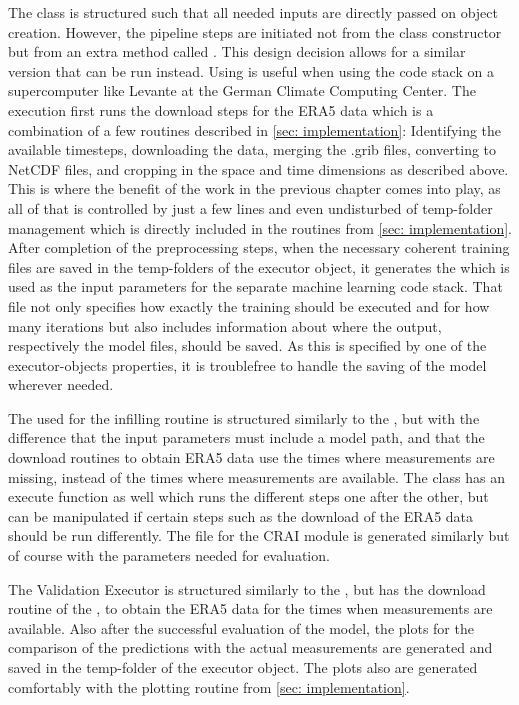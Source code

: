 The  class is structured such that all needed inputs are directly passed on object creation. However, the pipeline steps are initiated not from the class constructor but from an extra method called . This design decision allows for a similar  version that can be run instead. Using  is useful when using the code stack on a supercomputer like Levante at the German Climate Computing Center.
The execution first runs the download steps for the ERA5 data which is a combination of a few routines described in \autoref{sec: implementation}: Identifying the available timesteps, downloading the data, merging the .grib files, converting to NetCDF files, and cropping in the space and time dimensions as described above.
This is where the benefit of the work in the previous chapter comes into play, as all of that is controlled by just a few lines and even undisturbed of temp-folder management which is directly included in the routines from \autoref{sec: implementation}.
After completion of the preprocessing steps, when the necessary coherent training files are saved in the temp-folders of the executor object, it generates the  which is used as the input parameters for the separate machine learning code stack.
That file not only specifies how exactly the training should be executed and for how many iterations but also includes information about where the output, respectively the model files, should be saved.
As this is specified by one of the executor-objects properties, it is troublefree to handle the saving of the model wherever needed.

The  used for the infilling routine is structured similarly to the , but with the difference that the input parameters must include a model path, and that the download routines to obtain ERA5 data use the times where measurements are missing, instead of the times where measurements are available.
The class has an execute function as well which runs the different steps one after the other, but can be manipulated if certain steps such as the download of the ERA5 data should be run differently.
The  file for the CRAI module is generated similarly but of course with the parameters needed for evaluation.

The Validation Executor is structured similarly to the , but has the download routine of the , to obtain the ERA5 data for the times when measurements are available.
Also after the successful evaluation of the model, the plots for the comparison of the predictions with the actual measurements are generated and saved in the temp-folder of the executor object.
The plots also are generated comfortably with the plotting routine from \autoref{sec: implementation}.

